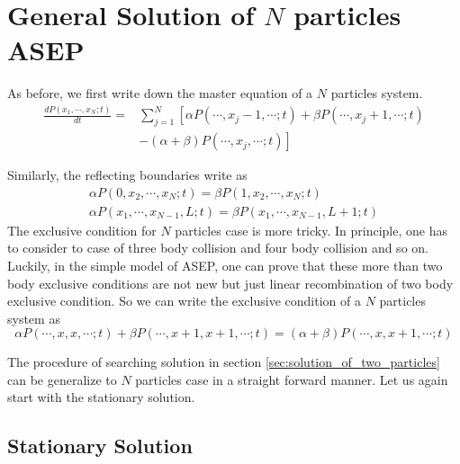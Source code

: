 \documentclass[12pt,a4paper]{article}
\begin{document}
\section{General Solution of $N$ particles ASEP}
\label{sec:general_solution_of_n_particles_asep}

As before, we first write down the master equation of a $N$ particles system.
\begin{equation}
    \begin{aligned}
        \label{eq:masterEqN}
        \frac{d P(x_1, \cdots, x_N; t)}{dt} = & \sum_{j=1}^N \left[\alpha
            P(\cdots,x_j-1,\cdots;t) + \beta P(\cdots, x_j+1, \cdots;t)\right. \\ 
        & \left.- (\alpha+\beta)P(\cdots, x_j, \cdots; t)\right]
    \end{aligned}
\end{equation}

Similarly, the reflecting boundaries write as
\begin{subequations}
    \label{eq:boundaries-N-particles}
    \begin{eqnarray}
        \alpha P(0,x_2,\cdots,x_N; t) = \beta P(1, x_2,\cdots, x_N; t) \\
        \alpha P(x_1,\cdots, x_{N-1}, L;t) = \beta P(x_1,\cdots, x_{N-1}, L+1;t)
    \end{eqnarray}
\end{subequations}
The exclusive condition for $N$ particles case is more tricky. In principle,
one has to consider to case of three body collision and four body collision and
so on. Luckily, in the simple model of ASEP, one can prove that these more than
two body exclusive conditions are not new but just linear recombination of two
body exclusive condition. So we can write the exclusive condition of a $N$
particles system as 
\begin{equation}
    \label{eq:exclusionConditionN}
    \alpha P(\cdots,x, x,\cdots; t) + \beta P(\cdots, x+1, x+1, \cdots; t) 
    = (\alpha + \beta) P(\cdots, x, x+1, \cdots; t)
\end{equation}

The procedure of searching solution in section
\ref{sec:solution_of_two_particles} can be generalize to $N$ particles case in a
straight forward manner. Let us again start with the stationary solution. 

\subsection{Stationary Solution}
\label{sub:stationary_solution}
\end{document}
